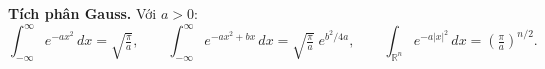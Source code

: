 \textbf{Tích phân Gauss.} Với $a>0$:
$$\int_{-\infty}^{\infty} e^{-ax^2}\,dx=\sqrt{\tfrac{\pi}{a}},\qquad
\int_{-\infty}^{\infty} e^{-ax^2+bx}\,dx=\sqrt{\tfrac{\pi}{a}}\;e^{b^2/4a},\qquad
\int_{\mathbb{R}^n} e^{-a|x|^2}\,dx=\left(\tfrac{\pi}{a}\right)^{n/2}.$$
